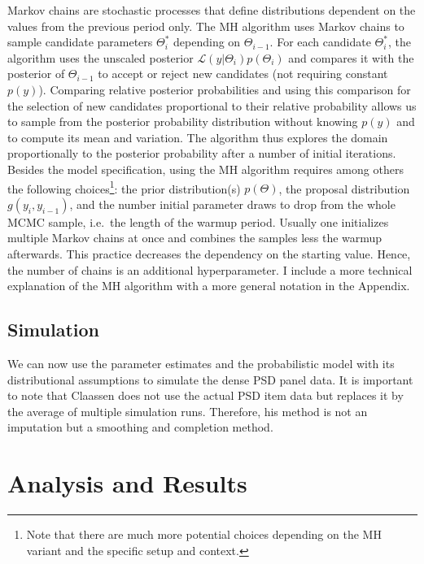 \documentclass[12pt,english,a4paper,oneside]{article}
\theoremstyle{definition}
\theoremstyle{definition}
\theoremstyle{definition}
\theoremstyle{definition}
\theoremstyle{remark}
\begin{document}
Markov chains are stochastic processes that define distributions dependent on the values from the previous period only. The MH algorithm uses Markov chains to sample candidate parameters \(\Theta_i^*\) depending on \(\Theta_{i-1}\). For each candidate \(\Theta_i^*\), the algorithm uses the unscaled posterior \(\mathcal{L}(y|\Theta_i)p(\Theta_i)\) and compares it with the posterior of \(\Theta_{i-1}\) to accept or reject new candidates (not requiring constant \(p(y)\)). Comparing relative posterior probabilities and using this comparison for the selection of new candidates proportional to their relative probability allows us to sample from the posterior probability distribution without knowing \(p(y)\) and to compute its mean and variation. The algorithm thus explores the domain proportionally to the posterior probability after a number of initial iterations. Besides the model specification, using the MH algorithm requires among others the following choices\footnote{Note that there are much more potential choices depending on the MH variant and the specific setup and context.}: the prior distribution(s) \(p(\Theta)\), the proposal distribution \(g(y_i, y_{i-1})\), and the number initial parameter draws to drop from the whole MCMC sample, i.e.~the length of the warmup period. Usually one initializes multiple Markov chains at once and combines the samples less the warmup afterwards. This practice decreases the dependency on the starting value. Hence, the number of chains is an additional hyperparameter. I include a more technical explanation of the MH algorithm with a more general notation in the Appendix.

\hypertarget{simulation}{%
\subsection{Simulation}\label{simulation}}

We can now use the parameter estimates and the probabilistic model with its distributional assumptions to simulate the dense PSD panel data. It is important to note that Claassen does not use the actual PSD item data but replaces it by the average of multiple simulation runs. Therefore, his method is not an imputation but a smoothing and completion method.

\hypertarget{analysis-and-results}{%
\section{Analysis and Results}\label{analysis-and-results}}
\end{document}
